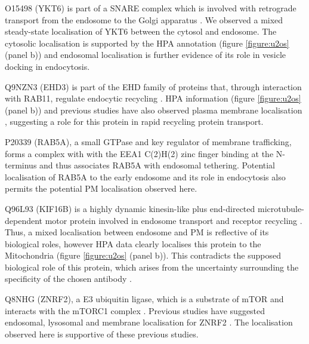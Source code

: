 \documentclass[12pt,english]{article}
\begin{document}
O15498 (YKT6) is part of a SNARE complex which is involved with retrograde transport from the endosome to the Golgi apparatus \citep{Tai:2004}. We observed a mixed steady-state localisation of YKT6 between the cytosol and endosome. The cytosolic localisation is supported by the HPA annotation (figure \ref{figure:u2os} (panel b)) and endosomal localisation is further evidence of its role in vesicle docking in endocytosis.

Q9NZN3 (EHD3) is part of the EHD family of proteins that, through interaction with RAB11, regulate endocytic recycling \citep{Naslavsky:2006,George:2007}. HPA information (figure \ref{figure:u2os} (panel b)) and previous studies have also observed plasma membrane localisation \citep{George:2007}, suggesting a role for this protein in rapid recycling protein transport. 

P20339 (RAB5A), a small GTPase and key regulator of membrane trafficking, forms a complex with with the EEA1 C(2)H(2) zinc finger binding at the N-terminus \citep{Mishra:2010} and thus associates RAB5A with endosomal tethering. Potential localisation of RAB5A to the early endosome \citep{Fouraux:2004, Hunker:2006} and its role in endocytosis also permits the potential PM localisation observed here.

Q96L93 (KIF16B) is a highly dynamic kinesin-like plus end-directed microtubule-dependent motor protein involved in endosome transport and receptor recycling \citep{Hoepfner:2005}. Thus, a mixed localisation between endosome and PM is reflective of its biological roles, however HPA data clearly localises this protein to the Mitochondria (figure \ref{figure:u2os} (panel b)). This contradicts the supposed biological role of this protein, which arises from the uncertainty surrounding the specificity of the chosen antibody \citep{Thul:2017}.

Q8NHG (ZNRF2), a E3 ubiquitin ligase, which is a substrate of mTOR and interacts with the mTORC1 complex \citep{Hoxhaj:2016}. Previous studies have suggested endosomal, lysosomal and membrane localisation  for ZNRF2 \citep{Araki:2003, Hoxhaj:2016}. The localisation observed here is supportive of these previous studies.
\end{document}
